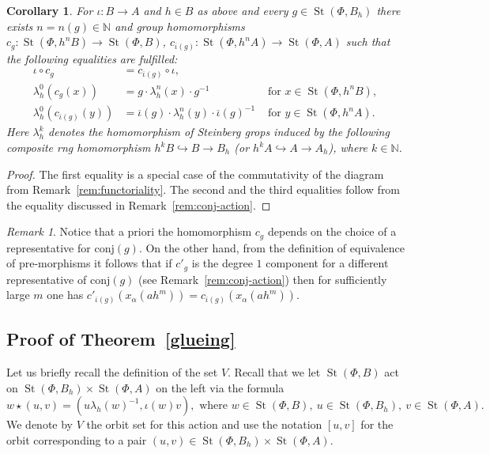 \documentclass[oneside, 11pt]{amsart}
\numberwithin{equation}{section}
\newtheorem{corollary}[lemma]{Corollary}
\newcommand{\St}{\mathop{\mathrm{St}}\nolimits}
\theoremstyle{definition}
\theoremstyle{definition}
\theoremstyle{remark}
\newtheorem{rem}[lemma]{Remark}
\begin{document}
\begin{corollary}
\label{vorcor}
For $\iota \colon B \to A$ and $h \in B$ as above and every $g \in \St(\Phi, B_h)$ there exists $n = n(g) \in \mathbb{N}$ 
and group homomorphisms $c_g \colon \St(\Phi, h^nB) \to \St(\Phi, B)$, $c_{\overline{\iota}(g)} \colon \St(\Phi, h^nA) \to \St(\Phi, A)$
such that the following equalities are fulfilled:
\begin{align}
 \label{eq:coherence} \iota \circ c_g &= c_{\overline{\iota}(g)} \circ \iota, &\\
 \label{eq:strictB} \lambda_h^0 (c_g (x)) &= g \cdot \lambda_h^n(x) \cdot g^{-1}&\text{ for }x \in \St(\Phi, h^nB),\\
 \label{eq:strictA} \lambda_h^0 (c_{\overline{\iota}(g)}(y)) &= \overline{\iota}(g) \cdot \lambda_h^n(y) \cdot \overline{\iota}(g)^{-1}&\text{ for }y \in \St(\Phi, h^nA).
\end{align}
Here $\lambda_h^k$ denotes the homomorphism of Steinberg grops induced by the following composite rng homomorphism $h^kB \hookrightarrow B \to B_h$ (or $h^kA \hookrightarrow A \to A_{h}$), where $k \in \mathbb{N}$.
\end{corollary}
\begin{proof}
 The first equality is a special case of the commutativity of the diagram from Remark~\ref{rem:functoriality}.
 The second and the third equalities follow from the equality discussed in Remark~\ref{rem:conj-action}.
\end{proof}
\begin{rem}\label{rem:indendepence}
 Notice that a priori the homomorphism $c_g$ depends on the choice of a representative for $\mathrm{conj}(g)$. On the other hand, from the definition of equivalence of pre-morphisms it follows that if $c'_g$ is the degree $1$ component for a different representative of $\mathrm{conj}(g)$ (see Remark~\ref{rem:conj-action}) then for sufficiently large $m$ one has $c'_{\overline{\iota}(g)}(x_{\alpha}(ah^m)) = c_{\overline{\iota}(g)}(x_{\alpha}(ah^m))$.
\end{rem}


\subsection{Proof of Theorem~\ref{glueing}} \label{sec:proof-glueing}

Let us briefly recall the definition of the set $V$. Recall that we let $\St(\Phi, B)$ act on $\St(\Phi, B_h) \times \St(\Phi, A)$ on the left via the formula 
\[w \star (u, v) = (u \lambda_h(w)^{-1}, \iota(w) v),\text{ where }w \in \St(\Phi, B),\ u \in \St(\Phi, B_h),\ v \in \St(\Phi, A).\]
We denote by $V$ the orbit set for this action and use the notation $[u, v]$ for the orbit corresponding to a pair $(u, v) \in \St(\Phi, B_h) \times \St(\Phi, A)$.
\end{document}
